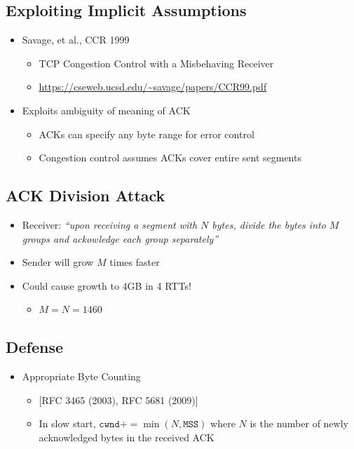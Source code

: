 \subsection{Exploiting Implicit Assumptions}
\begin{itemize}[nosep]
    \item Savage, et al., CCR 1999
          \begin{itemize}[nosep]
              \item TCP Congestion Control with a Misbehaving Receiver
              \item \url{https://cseweb.ucsd.edu/~savage/papers/CCR99.pdf}
          \end{itemize}
    \item Exploits ambiguity of meaning of ACK
          \begin{itemize}[nosep]
              \item ACKs can specify any byte range for error control
              \item Congestion control assumes ACKs cover entire sent segments
          \end{itemize}
\end{itemize}
\subsection{ACK Division Attack}
\begin{itemize}[nosep]
    \item Receiver: \textit{``upon receiving a segment with $N$ bytes, divide the bytes into $M$ groups and ackowledge each group separately''}
    \item Sender will grow $M$ times faster
    \item Could cause growth to 4GB in 4 RTTs!
          \begin{itemize}[nosep]
              \item $M = N = 1460$
          \end{itemize}
\end{itemize}
\subsection{Defense}
\begin{itemize}[nosep]
    \item Appropriate Byte Counting
          \begin{itemize}[nosep]
              \item \phantom{}[RFC 3465 (2003), RFC 5681 (2009)]
              \item In slow start, $\texttt{cwnd} += \min(N, \texttt{MSS})$ where $N$ is the number of newly acknowledged bytes in the received ACK
          \end{itemize}
\end{itemize}
